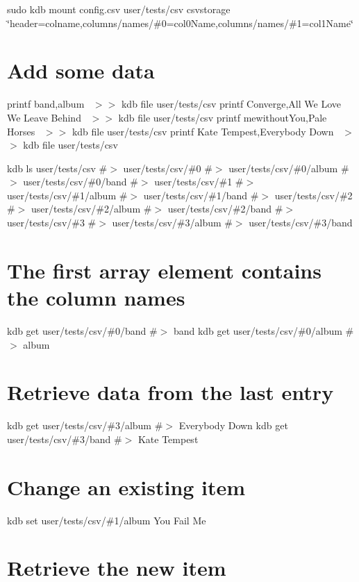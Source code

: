 sudo kdb mount config.\+csv user/tests/csv csvstorage \char`\"{}header=colname,columns/names/\#0=col0\+Name,columns/names/\#1=col1\+Name\char`\"{}

\section*{Add some data}

printf \textquotesingle{}band,album~\newline
\textquotesingle{} $>$$>$ {\ttfamily kdb file user/tests/csv} printf \textquotesingle{}Converge,All We Love We Leave Behind~\newline
\textquotesingle{} $>$$>$ {\ttfamily kdb file user/tests/csv} printf \textquotesingle{}mewithout\+You,Pale Horses~\newline
\textquotesingle{} $>$$>$ {\ttfamily kdb file user/tests/csv} printf \textquotesingle{}Kate Tempest,Everybody Down~\newline
\textquotesingle{} $>$$>$ {\ttfamily kdb file user/tests/csv}

kdb ls user/tests/csv \#$>$ user/tests/csv/\#0 \#$>$ user/tests/csv/\#0/album \#$>$ user/tests/csv/\#0/band \#$>$ user/tests/csv/\#1 \#$>$ user/tests/csv/\#1/album \#$>$ user/tests/csv/\#1/band \#$>$ user/tests/csv/\#2 \#$>$ user/tests/csv/\#2/album \#$>$ user/tests/csv/\#2/band \#$>$ user/tests/csv/\#3 \#$>$ user/tests/csv/\#3/album \#$>$ user/tests/csv/\#3/band

\section*{The first array element contains the column names}

kdb get user/tests/csv/\#0/band \#$>$ band kdb get user/tests/csv/\#0/album \#$>$ album

\section*{Retrieve data from the last entry}

kdb get user/tests/csv/\#3/album \#$>$ Everybody Down kdb get user/tests/csv/\#3/band \#$>$ Kate Tempest

\section*{Change an existing item}

kdb set user/tests/csv/\#1/album \textquotesingle{}You Fail Me\textquotesingle{} \section*{Retrieve the new item}

